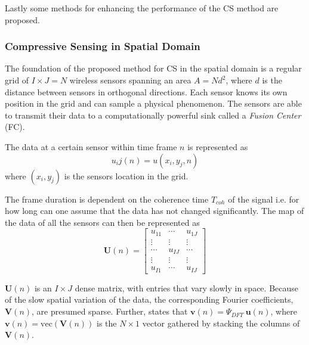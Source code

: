 \documentclass[Main]{subfiles}
\begin{document}
		Lastly some methods for enhancing the performance of the CS method are proposed.
		
		\subsubsection{Compressive Sensing in Spatial Domain} %
		\label{sub:compressive_sensing_in_spatial_domain}

			The foundation of the proposed method for CS in the spatial domain is a regular grid of $I \times J = N$ wireless sensors spanning an area $A = Nd^2$, where $d$ is the distance between sensors in orthogonal directions.
			Each sensor knows its own position in the grid and can sample a physical phenomenon.
			The sensors are able to transmit their data to a computationally powerful sink called a \emph{Fusion Center} (FC).

			The data at a certain sensor within time frame $n$ is represented as
			\begin{equation}
				u_ij(n) = u(x_i, y_j, n)
			\end{equation}
			where $(x_i, y_j)$ is the sensors location in the grid.

			The frame duration is dependent on the coherence time $T_{coh}$ of the signal i.e. for how long can one assume that the data has not changed significantly.
			The map of the data of all the sensors can then be represented as
			\begin{equation}
				\mathbf{U}(n) =
			 	\begin{bmatrix}
			  		u_{11}	&	\cdots 	& 	u_{1J}	\\
			  		\vdots	&	\vdots	&	\vdots	\\
					\cdots 	& 	u_{IJ}	& 	\cdots 	\\
					\vdots	&	\vdots	&	\vdots	\\
					u_{I1} 	& 	\cdots 	& 	u_{IJ}
				\end{bmatrix}
				\label{eq:dataMap}
			\end{equation}
			
			$\mathbf{U}(n)$ is an $I \times J$ dense matrix, with entries that vary slowly in space.
			Because of the slow spatial variation of the data, the corresponding Fourier coefficients, $\mathbf{V}(n)$, are presumed sparse.
			Further, \cite{Fazel2011} states that $\mathbf{v}(n) = \Psi_{DFT}\ \mathbf{u}(n)$, where $\mathbf{v}(n) = \text{vec}(\mathbf{V}(n))$ is the $N \times 1$ vector gathered by stacking the columns of $\mathbf{V}(n)$.
\end{document}
